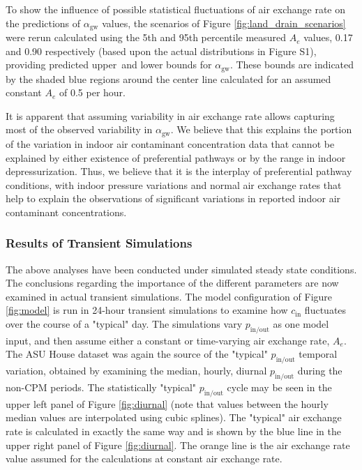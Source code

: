 \documentclass[preprint,12pt]{elsarticle}
\begin{document}
To show the influence of possible statistical fluctuations of air exchange rate on the predictions of $\alpha_\mathrm{gw}$ values, the scenarios of Figure \ref{fig:land_drain_scenarios} were rerun calculated using the 5th and 95th percentile measured $A_e$ values, 0.17 and 0.90 respectively (based upon the actual distributions in Figure S1), providing predicted upper and lower bounds for $\alpha_\mathrm{gw}$.
These bounds are indicated by the shaded blue regions around the center line calculated for an assumed constant $A_e$ of 0.5 per hour.\par

It is apparent that assuming variability in air exchange rate allows capturing most of the observed variability in $\alpha_\mathrm{gw}$.
We believe that this explains the portion of the variation in indoor air contaminant concentration data that cannot be explained by either existence of preferential pathways or by the range in indoor depressurization.
Thus, we believe that it is the interplay of preferential pathway conditions, with indoor pressure variations and normal air exchange rates that help to explain the observations of significant variations in reported indoor air contaminant concentrations.\par

\subsubsection{Results of Transient Simulations}\label{s:results_modeling_transient}

The above analyses have been conducted under simulated steady state conditions.
The conclusions regarding the importance of the different parameters are now examined in actual transient simulations.
The model configuration of Figure \ref{fig:model} is run in 24-hour transient simulations to examine how $c_\mathrm{in}$ fluctuates over the course  of a "typical" day.
The simulations vary $p_\mathrm{in/out}$ as one model input, and then assume either a constant or time-varying air exchange rate, $A_e$.
The ASU House dataset was again the source of the "typical" $p_\mathrm{in/out}$ temporal variation, obtained by examining the median, hourly, diurnal $p_\mathrm{in/out}$ during the non-CPM periods.
The statistically "typical" $p_\mathrm{in/out}$ cycle may be seen in the upper left panel of Figure \ref{fig:diurnal} (note that values between the hourly median values are interpolated using cubic splines).
The "typical" air exchange rate is calculated in exactly the same way and is shown by the blue line in the upper right panel of Figure \ref{fig:diurnal}.
The orange line is the air exchange rate value assumed for the calculations at constant air exchange rate.\par
\end{document}
